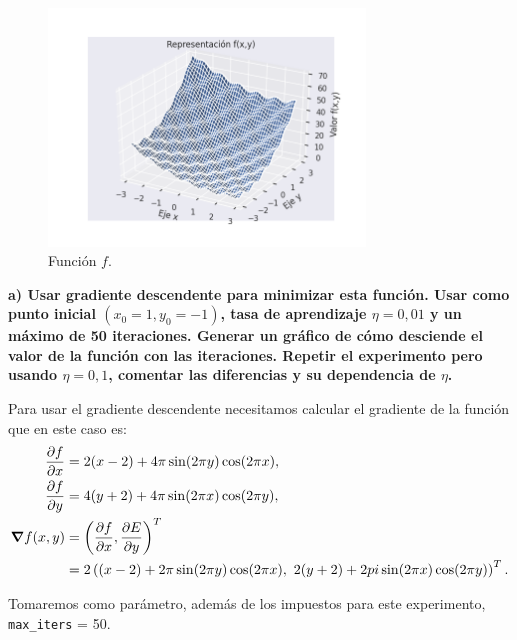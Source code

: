 \documentclass[a4paper, 20pt]{article}
\begin{document}
\begin{figure}[H]
    \centering
    \includegraphics[width=0.75\textwidth]{f1}
    \caption{Función $f$.}
    \label{fig:f1}
\end{figure}

\textbf{a) Usar gradiente descendente para minimizar esta función. Usar como punto inicial $(x_0 = 1, y_0 = -1)$, tasa de aprendizaje $\eta = 0,01$ y un máximo de 50 iteraciones.
Generar un gráfico de cómo desciende el valor de la función con las iteraciones. Repetir
el experimento pero usando $\eta = 0,1$, comentar las diferencias y su dependencia de $\eta$.}

Para usar el gradiente descendente necesitamos calcular el gradiente de la función que en este caso es:
\begin{align*}
\pdv{f}{x}(x,y) &= 2(x-2) + 4\pi \sin(2\pi y) \cos(2\pi x),\\
\pdv{f}{y}(x,y) &= 4(y+2)+4\pi \sin(2\pi x) \cos(2\pi y),\\
\grad{f}(x,y) &= \left(\pdv{f}{x}(x,y), \pdv{E}{y}(x,y)\right)^T\\
	      &= 2\left((x-2) + 2\pi \sin(2\pi y) \cos(2\pi x),\ 2(y+2)+2pi \sin(2\pi x) \cos(2\pi y)\right)^T.
\end{align*}

Tomaremos como parámetro, además de los impuestos para este experimento, \texttt{max\_iters} = 50.
\end{document}
